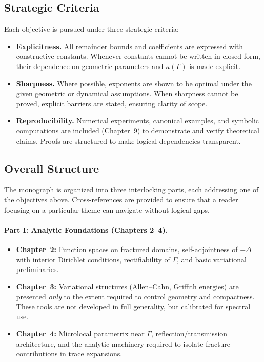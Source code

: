 \subsection*{Strategic Criteria}
Each objective is pursued under three strategic criteria:

\begin{itemize}
  \item \textbf{Explicitness.} All remainder bounds and coefficients are expressed with
  constructive constants. Whenever constants cannot be written in closed form, their
  dependence on geometric parameters and $\kappa(\Gamma)$ is made explicit.
  \item \textbf{Sharpness.} Where possible, exponents are shown to be optimal under the
  given geometric or dynamical assumptions. When sharpness cannot be proved, explicit
  barriers are stated, ensuring clarity of scope.
  \item \textbf{Reproducibility.} Numerical experiments, canonical examples, and
  symbolic computations are included (Chapter~9) to demonstrate and verify theoretical
  claims. Proofs are structured to make logical dependencies transparent.
\end{itemize}

\subsection*{Overall Structure}
The monograph is organized into three interlocking parts, each addressing one of the
objectives above. Cross-references are provided to ensure that a reader focusing on
a particular theme can navigate without logical gaps.

\paragraph{Part I: Analytic Foundations (Chapters 2–4).}
\begin{itemize}
  \item \textbf{Chapter~2:} Function spaces on fractured domains, self-adjointness of
  $-\Delta$ with interior Dirichlet conditions, rectifiability of $\Gamma$, and basic
  variational preliminaries.
  \item \textbf{Chapter~3:} Variational structures (Allen--Cahn, Griffith energies) are
  presented \emph{only} to the extent required to control geometry and compactness.
  These tools are not developed in full generality, but calibrated for spectral use.
  \item \textbf{Chapter~4:} Microlocal parametrix near $\Gamma$, reflection/transmission
  architecture, and the analytic machinery required to isolate fracture contributions
  in trace expansions.
\end{itemize}

